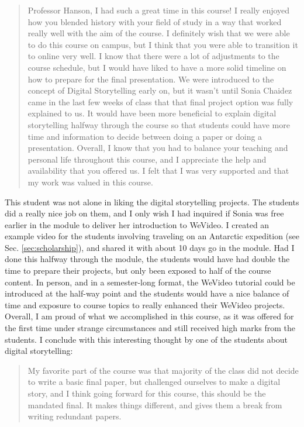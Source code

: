 \documentclass[../../../main.tex]{subfiles}
\begin{document}
\begin{quote}
Professor Hanson, I had such a great time in this course! I really enjoyed how you blended history with your field of study in a way that worked really well with the aim of the course. I definitely wish that we were able to do this course on campus, but I think that you were able to transition it to online very well. I know that there were a lot of adjustments to the course schedule, but I would have liked to have a more solid timeline on how to prepare for the final presentation. We were introduced to the concept of Digital Storytelling early on, but it wasn't until Sonia Chaidez came in the last few weeks of class that that final project option was fully explained to us. It would have been more beneficial to explain digital storytelling halfway through the course so that students could have more time and information to decide between doing a paper or doing a presentation. Overall, I know that you had to balance your teaching and personal life throughout this course, and I appreciate the help and availability that you offered us. I felt that I was very supported and that my work was valued in this course.
\end{quote}

This student was not alone in liking the digital storytelling projects.  The students did a really nice job on them, and I only wish I had inquired if Sonia was free earlier in the module to deliver her introduction to WeVideo.  I created an example video for the students involving traveling on an Antarctic expedition (see Sec. \ref{sec:scholarship}), and shared it with about 10 days go in the module.  Had I done this halfway through the module, the students would have had double the time to prepare their projects, but only been exposed to half of the course content.  In person, and in a semester-long format, the WeVideo tutorial could be introduced at the half-way point and the students would have a nice balance of time and exposure to course topics to really enhanced their WeVideo projects.  Overall, I am proud of what we accomplished in this course, as it was offered for the first time under strange circumstances and still received high marks from the students.  I conclude with this interesting thought by one of the students about digital storytelling:

\begin{quote}
My favorite part of the course was that majority of the class did not decide to write a basic final paper, but challenged ourselves to
make a digital story, and I think going forward for this course, this should be the mandated final. It makes things different, and gives them a break from writing redundant papers.
\end{quote}
\end{document}
